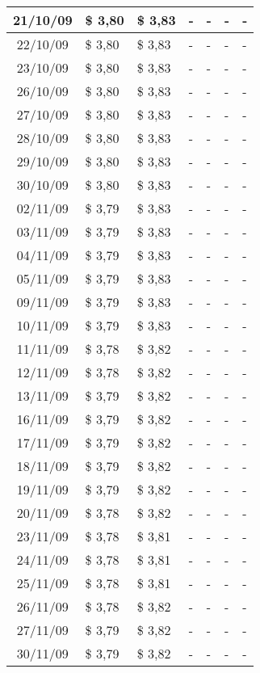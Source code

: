 \begin{center}
\begin{longtable}{|c|p{1.5cm}|p{1.5cm}|p{1.5cm}|p{1.5cm}|p{1.5cm}|p{1.5cm}|}
21/10/09 & \$ 3,80 & \$ 3,83 & - & - & - & - \\ \hline
22/10/09 & \$ 3,80 & \$ 3,83 & - & - & - & - \\ \hline
23/10/09 & \$ 3,80 & \$ 3,83 & - & - & - & - \\ \hline
26/10/09 & \$ 3,80 & \$ 3,83 & - & - & - & - \\ \hline
27/10/09 & \$ 3,80 & \$ 3,83 & - & - & - & - \\ \hline
28/10/09 & \$ 3,80 & \$ 3,83 & - & - & - & - \\ \hline
29/10/09 & \$ 3,80 & \$ 3,83 & - & - & - & - \\ \hline
30/10/09 & \$ 3,80 & \$ 3,83 & - & - & - & - \\ \hline
02/11/09 & \$ 3,79 & \$ 3,83 & - & - & - & - \\ \hline
03/11/09 & \$ 3,79 & \$ 3,83 & - & - & - & - \\ \hline
04/11/09 & \$ 3,79 & \$ 3,83 & - & - & - & - \\ \hline
05/11/09 & \$ 3,79 & \$ 3,83 & - & - & - & - \\ \hline
09/11/09 & \$ 3,79 & \$ 3,83 & - & - & - & - \\ \hline
10/11/09 & \$ 3,79 & \$ 3,83 & - & - & - & - \\ \hline
11/11/09 & \$ 3,78 & \$ 3,82 & - & - & - & - \\ \hline
12/11/09 & \$ 3,78 & \$ 3,82 & - & - & - & - \\ \hline
13/11/09 & \$ 3,79 & \$ 3,82 & - & - & - & - \\ \hline
16/11/09 & \$ 3,79 & \$ 3,82 & - & - & - & - \\ \hline
17/11/09 & \$ 3,79 & \$ 3,82 & - & - & - & - \\ \hline
18/11/09 & \$ 3,79 & \$ 3,82 & - & - & - & - \\ \hline
19/11/09 & \$ 3,79 & \$ 3,82 & - & - & - & - \\ \hline
20/11/09 & \$ 3,78 & \$ 3,82 & - & - & - & - \\ \hline
23/11/09 & \$ 3,78 & \$ 3,81 & - & - & - & - \\ \hline
24/11/09 & \$ 3,78 & \$ 3,81 & - & - & - & - \\ \hline
25/11/09 & \$ 3,78 & \$ 3,81 & - & - & - & - \\ \hline
26/11/09 & \$ 3,78 & \$ 3,82 & - & - & - & - \\ \hline
27/11/09 & \$ 3,79 & \$ 3,82 & - & - & - & - \\ \hline
30/11/09 & \$ 3,79 & \$ 3,82 & - & - & - & - \\ \hline

\end{longtable}
\end{center}
